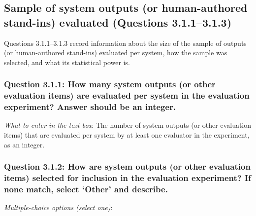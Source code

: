 \documentclass[11pt,a4paper]{article}
\begin{document}
\subsection{Sample of system outputs (or human-authored stand-ins) evaluated (Questions 3.1.1--3.1.3)}

Questions 3.1.1--3.1.3 record information about the size of the sample of outputs (or human-authored stand-ins) evaluated per system, how the sample was selected, and what its statistical power is.

\vspace{-.3cm}
\subsubsection*{Question 3.1.1: How many system outputs (or other evaluation items) are evaluated per system in the evaluation experiment? Answer should be an integer.}

\noindent\textit{What to enter in the text box}: The number of system outputs (or other evaluation items) that are evaluated per system by at least one evaluator in the experiment, as an integer.

\vspace{-.3cm}
\subsubsection*{Question 3.1.2: How are system outputs (or other evaluation items) selected for inclusion in the evaluation experiment? If none match, select `Other' and describe.}

\noindent\textit{Multiple-choice options (select one)}:  
\vspace{-.1cm}
\end{document}

